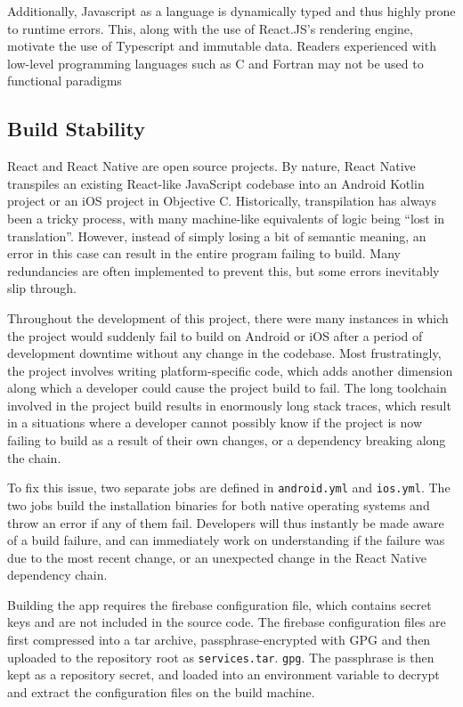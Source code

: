 Additionally, Javascript as a language is dynamically typed and thus highly prone to runtime errors. This, along with the use of React.JS's rendering engine, motivate the use of Typescript and immutable data. Readers experienced with low-level programming languages such as C and Fortran may not be used to functional paradigms

\subsection{Build Stability}
React and React Native are open source projects. By nature, React Native transpiles an existing React-like JavaScript codebase into an Android Kotlin project or an iOS project in Objective C. Historically, transpilation has always been a tricky process, with many machine-like equivalents of logic being ``lost in translation''. However, instead of simply losing a bit of semantic meaning, an error in this case can result in the entire program failing to build. Many redundancies are often implemented to prevent this, but some errors inevitably slip through.

Throughout the development of this project, there were many instances in which the project would suddenly fail to build on Android or iOS after a period of development downtime without any change in the codebase. Most frustratingly, the project involves writing platform-specific code, which adds another dimension along which a developer could cause the project build to fail. The long toolchain involved in the project build results in enormously long stack traces, which result in a situations where a developer cannot possibly know if the project is now failing to build as a result of their own changes, or a dependency breaking along the chain.

To fix this issue, two separate jobs are defined in \texttt{android.yml} and \texttt{ios.yml}. The two jobs build the installation binaries for both native operating systems and throw an error if any of them fail. Developers will thus instantly be made aware of a build failure, and can immediately work on understanding if the failure was due to the most recent change, or an unexpected change in the React Native dependency chain.

Building the app requires the firebase configuration file, which contains secret keys and are not included in the source code. The firebase configuration files are first compressed into a tar archive, passphrase-encrypted with GPG and then uploaded to the repository root as \texttt{services.tar}.
\texttt{gpg}. The passphrase is then kept as a repository secret, and loaded into an environment variable to decrypt and extract the configuration files on the build machine.

